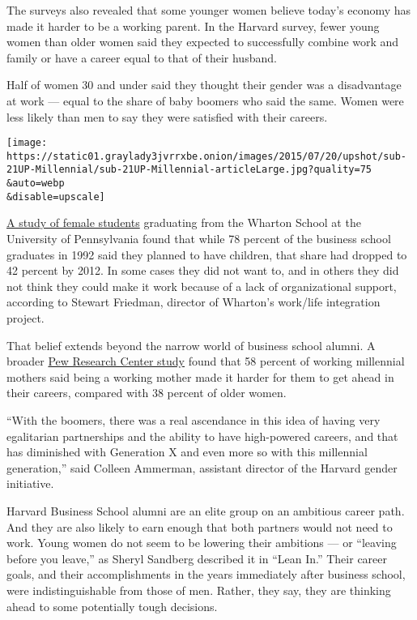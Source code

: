 The surveys also revealed that some younger women believe today's
economy has made it harder to be a working parent. In the Harvard
survey, fewer young women than older women said they expected to
successfully combine work and family or have a career equal to that of
their husband.

Half of women 30 and under said they thought their gender was a
disadvantage at work --- equal to the share of baby boomers who said the
same. Women were less likely than men to say they were satisfied with
their careers.

\texttt{[image: https://static01.graylady3jvrrxbe.onion/images/2015/07/20/upshot/sub-21UP-Millennial/sub-21UP-Millennial-articleLarge.jpg?quality=75\\\&auto=webp\\\&disable=upscale]}

\href{http://knowledge.wharton.upenn.edu/article/stew-friedman-new-work-family-choices-men-women/}{A
study of female students} graduating from the Wharton School at the
University of Pennsylvania found that while 78 percent of the business
school graduates in 1992 said they planned to have children, that share
had dropped to 42 percent by 2012. In some cases they did not want to,
and in others they did not think they could make it work because of a
lack of organizational support, according to Stewart Friedman, director
of Wharton's work/life integration project.

That belief extends beyond the narrow world of business school alumni. A
broader
\href{http://www.pewresearch.org/fact-tank/2015/03/10/women-still-bear-heavier-load-than-men-balancing-work-family/}{Pew
Research Center study} found that 58 percent of working millennial
mothers said being a working mother made it harder for them to get ahead
in their careers, compared with 38 percent of older women.

``With the boomers, there was a real ascendance in this idea of having
very egalitarian partnerships and the ability to have high-powered
careers, and that has diminished with Generation X and even more so with
this millennial generation,'' said Colleen Ammerman, assistant director
of the Harvard gender initiative.

Harvard Business School alumni are an elite group on an ambitious career
path. And they are also likely to earn enough that both partners would
not need to work. Young women do not seem to be lowering their ambitions
--- or ``leaving before you leave,'' as Sheryl Sandberg described it in
``Lean In.'' Their career goals, and their accomplishments in the years
immediately after business school, were indistinguishable from those of
men. Rather, they say, they are thinking ahead to some potentially tough
decisions.

